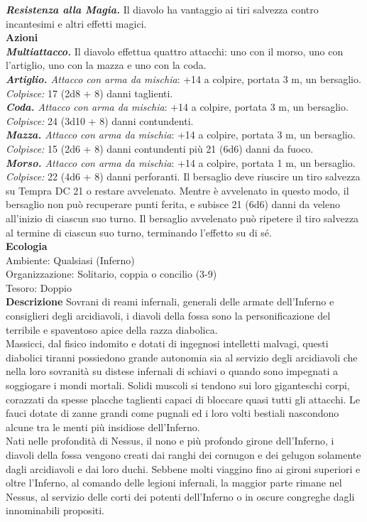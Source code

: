 \begin{multicols}{2}
\emph{\textbf{Resistenza alla Magia.}} Il diavolo ha vantaggio ai tiri salvezza contro incantesimi e altri effetti magici.\\
\smallskip\textbf{Azioni}\\
\emph{\textbf{Multiattacco.}} Il diavolo effettua quattro attacchi: uno con il morso, uno con l'artiglio, uno con la mazza e uno con la coda.\\
\emph{\textbf{Artiglio.} Attacco con arma da mischia}: +14 a colpire, portata 3 m, un bersaglio.\\
\emph{Colpisce:} 17 (2d8 + 8) danni taglienti.\\
\emph{\textbf{Coda.} Attacco con arma da mischia}: +14 a colpire, portata 3 m, un bersaglio.\\
\emph{Colpisce:} 24 (3d10 + 8) danni contundenti.\\
\emph{\textbf{Mazza.} Attacco con arma da mischia}: +14 a colpire, portata 3 m, un bersaglio.\\
\emph{Colpisce:} 15 (2d6 + 8) danni contundenti più 21 (6d6) danni da fuoco.\\
\emph{\textbf{Morso.} Attacco con arma da mischia}: +14 a colpire, portata 1 m, un bersaglio.\\
\emph{Colpisce:} 22 (4d6 + 8) danni perforanti. Il bersaglio deve riuscire un tiro salvezza su Tempra DC 21 o restare avvelenato. Mentre è avvelenato in questo modo, il bersaglio non può recuperare punti ferita, e subisce 21 (6d6) danni da veleno all'inizio di ciascun suo turno. Il bersaglio avvelenato può ripetere il tiro salvezza al termine di ciascun suo turno, terminando l'effetto su di sé. \\
\textbf{Ecologia}\\
Ambiente: Qualsiasi (Inferno)\\
Organizzazione: Solitario, coppia o concilio (3-9)\\
Tesoro: Doppio\\
\textbf{Descrizione}
Sovrani di reami infernali, generali delle armate dell’Inferno e consiglieri degli arcidiavoli, i diavoli della fossa sono la personificazione del terribile e spaventoso apice della razza diabolica.\\
Massicci, dal fisico indomito e dotati di ingegnosi intelletti malvagi, questi diabolici tiranni possiedono grande autonomia sia al servizio degli arcidiavoli che nella loro sovranità su distese infernali di schiavi o quando sono impegnati a soggiogare i mondi mortali. Solidi muscoli si tendono sui loro giganteschi corpi, corazzati da spesse placche taglienti capaci di bloccare quasi tutti gli attacchi. Le fauci dotate di zanne grandi come pugnali ed i loro volti bestiali nascondono alcune tra le menti più insidiose dell’Inferno.\\
Nati nelle profondità di Nessus, il nono e più profondo girone dell’Inferno, i diavoli della fossa vengono creati dai ranghi dei cornugon e dei gelugon solamente dagli arcidiavoli e dai loro duchi. Sebbene molti viaggino fino ai gironi superiori e oltre l’Inferno, al comando delle legioni infernali, la maggior parte rimane nel Nessus, al servizio delle corti dei potenti dell’Inferno o in oscure congreghe dagli innominabili propositi.\\


\end{multicols}
